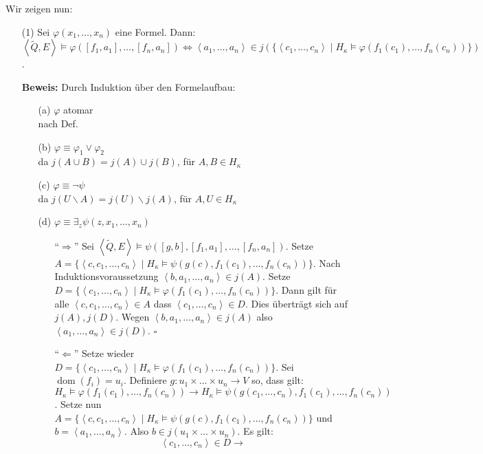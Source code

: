 \documentclass[a4paper,fontsize=11pt]{scrartcl}
\newcommand{\dom}{\operatorname{dom}}
\begin{document}
Wir zeigen nun:
\begin{itemize}
  \item[(1)] Sei $\varphi(x_1,\ldots,x_n)$ eine Formel. Dann: $\left<\tilde{Q},E\right>\models\varphi([f_1,a_1],\ldots,[f_n,a_n]) \Leftrightarrow
    \left<a_1,\ldots,a_n\right>\in j(\{\left<c_1,\ldots,c_n\right>\mid H_\kappa\models\varphi(f_1(c_1),\ldots,f_n(c_n))\})$.
  \item[] {\bf Beweis:} Durch Induktion über den Formelaufbau:
    \begin{itemize}
      \item[(a)] $\varphi$ atomar \\ nach Def.
      \item[(b)] $\varphi \equiv \varphi_1 \vee \varphi_2$ \\ da $j(A\cup B) = j(A) \cup j(B)$, für $A,B\in H_\kappa$
      \item[(c)] $\varphi \equiv \lnot \psi$ \\ da $j(U\backslash A) = j(U)\backslash j(A)$, für $A, U\in H_\kappa$
      \item[(d)] $\varphi \equiv \exists_z \psi(z,x_1,\ldots,x_n)$
        \begin{itemize}
          \item[``$\Rightarrow$''] Sei $\left<\tilde{Q},E\right>\models \psi([g,b],[f_1,a_1],\ldots,[f_n,a_n])$. Setze $A =
            \{\left<c,c_1,\ldots,c_n\right>\mid H_\kappa \models \psi(g(c),f_1(c_1),\ldots,f_n(c_n))\}$. Nach Induktionsvoraussetzung
            $\left<b,a_1,\ldots,a_n\right>\in j(A)$. Setze $D=\{\left<c_1,\ldots,c_n\right>\mid
            H_\kappa\models\varphi(f_1(c_1),\ldots,f_n(c_n))\}$. Dann gilt für alle $\left<c,c_1,\ldots,c_n\right>\in A$ dass
            $\left<c_1,\ldots,c_n\right>\in D$. Dies überträgt sich auf $j(A),j(D)$. Wegen $\left<b,a_1,\ldots,a_n\right>\in j(A)$ also
            $\left<a_1,\ldots,a_n\right>\in j(D)$. \hfill $\square$
          \item[``$\Leftarrow$''] Setze wieder $D=\{\left<c_1,\ldots,c_n\right>\mid H_\kappa\models\varphi(f_1(c_1),\ldots,f_n(c_n))\}$. Sei
            $\dom(f_i)=u_i$. Definiere $g:u_1\times\ldots\times u_n \rightarrow V$ so, dass gilt:
            $H_\kappa\models\varphi(f_1(c_1),\ldots,f_n(c_n))\rightarrow H_\kappa\models\psi(g(c_1,\ldots,c_n),f_1(c_1),\ldots,f_n(c_n))$. Setze nun
            $A = \{\left<c,c_1,\ldots,c_n\right>\mid H_\kappa\models\psi(g(c),f_1(c_1),\ldots,f_n(c_n))\}$ und $b = \left<a_1,\ldots,a_n\right>$. Also
            $b\in j(u_1\times\ldots\times u_n)$. Es gilt: $$ \left<c_1,\ldots,c_n\right>\in D\rightarrow
$$
\end{itemize}
\end{itemize}
\end{itemize}
\end{document}
